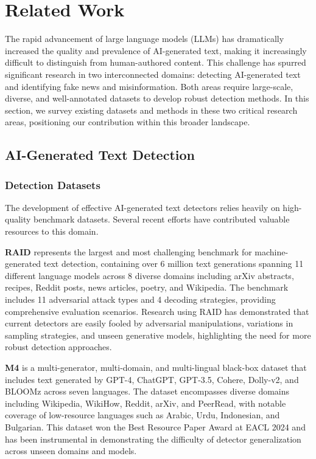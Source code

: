 \section{Related Work}

The rapid advancement of large language models (LLMs) has dramatically increased the quality and prevalence of AI-generated text, making it increasingly difficult to distinguish from human-authored content. This challenge has spurred significant research in two interconnected domains: detecting AI-generated text and identifying fake news and misinformation. Both areas require large-scale, diverse, and well-annotated datasets to develop robust detection methods. In this section, we survey existing datasets and methods in these two critical research areas, positioning our contribution within this broader landscape.

\subsection{AI-Generated Text Detection}

\subsubsection{Detection Datasets}

The development of effective AI-generated text detectors relies heavily on high-quality benchmark datasets. Several recent efforts have contributed valuable resources to this domain.

\textbf{RAID} \cite{raid2024} represents the largest and most challenging benchmark for machine-generated text detection, containing over 6 million text generations spanning 11 different language models across 8 diverse domains including arXiv abstracts, recipes, Reddit posts, news articles, poetry, and Wikipedia. The benchmark includes 11 adversarial attack types and 4 decoding strategies, providing comprehensive evaluation scenarios. Research using RAID has demonstrated that current detectors are easily fooled by adversarial manipulations, variations in sampling strategies, and unseen generative models, highlighting the need for more robust detection approaches.

\textbf{M4} \cite{m42024} is a multi-generator, multi-domain, and multi-lingual black-box dataset that includes text generated by GPT-4, ChatGPT, GPT-3.5, Cohere, Dolly-v2, and BLOOMz across seven languages. The dataset encompasses diverse domains including Wikipedia, WikiHow, Reddit, arXiv, and PeerRead, with notable coverage of low-resource languages such as Arabic, Urdu, Indonesian, and Bulgarian. This dataset won the Best Resource Paper Award at EACL 2024 and has been instrumental in demonstrating the difficulty of detector generalization across unseen domains and models.

